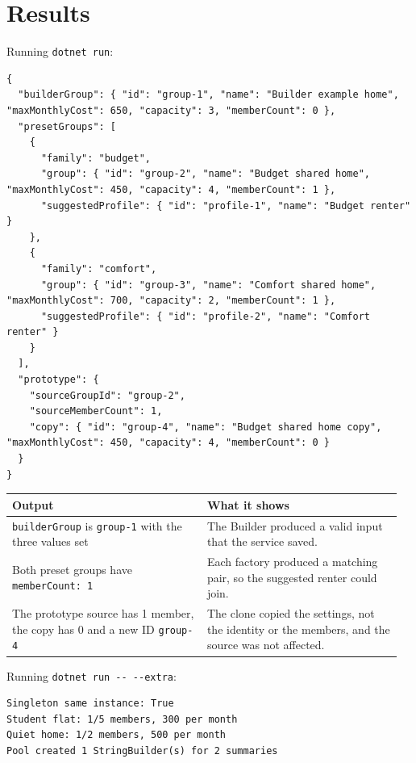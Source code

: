 \documentclass{utmreport}
\providecommand{\passthrough}[1]{#1}
\newcounter{none}
\begin{document}
\chapter{Results}

Running \passthrough{\lstinline!dotnet run!}:

\begin{lstlisting}
{
  "builderGroup": { "id": "group-1", "name": "Builder example home", "maxMonthlyCost": 650, "capacity": 3, "memberCount": 0 },
  "presetGroups": [
    {
      "family": "budget",
      "group": { "id": "group-2", "name": "Budget shared home", "maxMonthlyCost": 450, "capacity": 4, "memberCount": 1 },
      "suggestedProfile": { "id": "profile-1", "name": "Budget renter" }
    },
    {
      "family": "comfort",
      "group": { "id": "group-3", "name": "Comfort shared home", "maxMonthlyCost": 700, "capacity": 2, "memberCount": 1 },
      "suggestedProfile": { "id": "profile-2", "name": "Comfort renter" }
    }
  ],
  "prototype": {
    "sourceGroupId": "group-2",
    "sourceMemberCount": 1,
    "copy": { "id": "group-4", "name": "Budget shared home copy", "maxMonthlyCost": 450, "capacity": 4, "memberCount": 0 }
  }
}
\end{lstlisting}

{\def\LTcaptype{none} %
\begin{longtable}[]{@{}>{\raggedright\arraybackslash}p{0.480\linewidth}>{\raggedright\arraybackslash}p{0.480\linewidth}@{}}
\toprule\noalign{}
Output & What it shows \\
\midrule\noalign{}
\endhead
\bottomrule\noalign{}
\endlastfoot
\passthrough{\lstinline!builderGroup!} is \passthrough{\lstinline!group-1!} with the three values set & The Builder produced a valid input that the service saved. \\
Both preset groups have \passthrough{\lstinline!memberCount: 1!} & Each factory produced a matching pair, so the suggested renter could join. \\
The prototype source has 1 member, the copy has 0 and a new ID \passthrough{\lstinline!group-4!} & The clone copied the settings, not the identity or the members, and the source was not affected. \\
\end{longtable}
}

Running \passthrough{\lstinline!dotnet run -- --extra!}:

\begin{lstlisting}
Singleton same instance: True
Student flat: 1/5 members, 300 per month
Quiet home: 1/2 members, 500 per month
Pool created 1 StringBuilder(s) for 2 summaries
\end{lstlisting}
\end{document}
